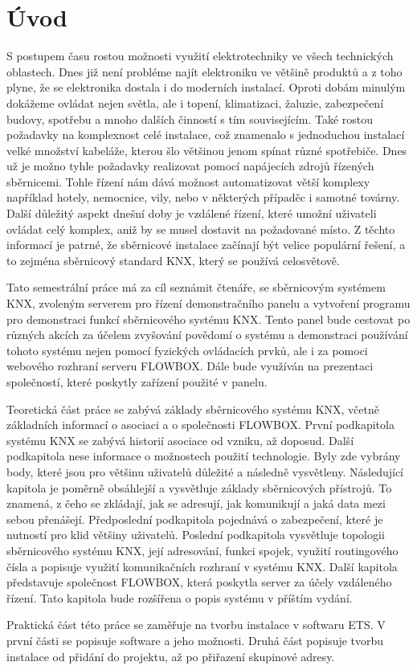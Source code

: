 \chapter*{Úvod}
{}

S postupem času rostou možnosti využití elektrotechniky ve všech technických oblastech. Dnes již není probléme najít elektroniku ve většině produktů a z toho plyne, že se elektronika dostala i do moderních instalací. Oproti dobám minulým dokážeme ovládat nejen světla, ale i topení, klimatizaci, žaluzie, zabezpečení budovy, spotřebu a mnoho dalších činností s tím souvisejícím. Také rostou požadavky na komplexnost celé instalace, což znamenalo s jednoduchou instalací velké množství kabeláže, kterou šlo většinou jenom spínat různé spotřebiče. Dnes už je možno tyhle požadavky realizovat pomocí napájecích zdrojů řízených sběrnicemi. Tohle řízení nám dává možnost automatizovat větší komplexy například hotely, nemocnice, vily, nebo v některých případěc i samotné továrny. Další důležitý aspekt dnešní doby je vzdálené řízení, které umožní uživateli ovládat celý komplex, aniž by se musel dostavit na požadované místo. Z těchto informací je patrné, že sběrnicové instalace začínají být velice populární řešení, a to zejména sběrnicový standard KNX, který se používá celosvětově.

Tato semestrální práce má za cíl seznámit čtenáře, se sběrnicovým systémem KNX, zvoleným serverem pro řízení demonstračního panelu a vytvoření programu pro demonstraci funkcí sběrnicového systému KNX. Tento panel bude cestovat po různých akcích za účelem zvyšování povědomí o systému a demonstraci používání tohoto systému nejen pomocí fyzických ovládacích prvků, ale i za pomoci webového rozhraní serveru FLOWBOX. Dále bude využíván na prezentaci společností, které poskytly zařízení použité v panelu.

Teoretická část práce se zabývá základy sběrnicového systému KNX, včetně základních informací o asociaci a o společnosti FLOWBOX. První podkapitola systému KNX se zabývá historií asociace od vzniku, až doposud. Další podkapitola nese informace o možnostech použití technologie. Byly zde vybrány body, které jsou pro většinu uživatelů důležité a následně vysvětleny. Následující kapitola je poměrně obsáhlejší a vysvětluje základy sběrnicových přístrojů. To znamená, z čeho se zkládají, jak se adresují, jak komunikují a jaká data mezi sebou přenášejí. Předposlední podkapitola pojednává o zabezpečení, které je nutností pro klid většiny uživatelů. Poslední podkapitola vysvětluje topologii sběrnicového systému KNX, její adresování, funkci spojek, využití routingového čísla a popisuje využití komunikačních rozhraní v systému KNX. Další kapitola představuje společnost FLOWBOX, která poskytla server za účely vzdáleného řízení. Tato kapitola bude rozšířena o popis systému v příštím vydání.

Praktická část této práce se zaměřuje na tvorbu instalace v softwaru ETS. V první části se popisuje software a jeho možnosti. Druhá část popisuje tvorbu instalace od přidání do projektu, až po přiřazení skupinové adresy.